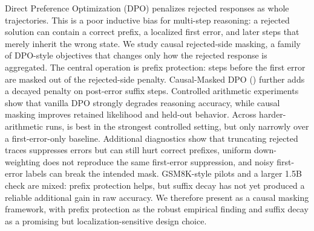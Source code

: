 Direct Preference Optimization (DPO) penalizes rejected responses as whole trajectories. This is a poor inductive bias for multi-step reasoning: a rejected solution can contain a correct prefix, a localized first error, and later steps that merely inherit the wrong state. We study causal rejected-side masking, a family of DPO-style objectives that changes only how the rejected response is aggregated. The central operation is prefix protection: steps before the first error are masked out of the rejected-side penalty. Causal-Masked DPO (\cmdpo) further adds a decayed penalty on post-error suffix steps. Controlled arithmetic experiments show that vanilla DPO strongly degrades reasoning accuracy, while causal masking improves retained likelihood and held-out behavior. Across harder-arithmetic runs, \cmdpo{} is best in the strongest controlled setting, but only narrowly over a first-error-only baseline. Additional diagnostics show that truncating rejected traces suppresses errors but can still hurt correct prefixes, uniform down-weighting does not reproduce the same first-error suppression, and noisy first-error labels can break the intended mask. GSM8K-style pilots and a larger 1.5B check are mixed: prefix protection helps, but suffix decay has not yet produced a reliable additional gain in raw accuracy. We therefore present \cmdpo{} as a causal masking framework, with prefix protection as the robust empirical finding and suffix decay as a promising but localization-sensitive design choice.
